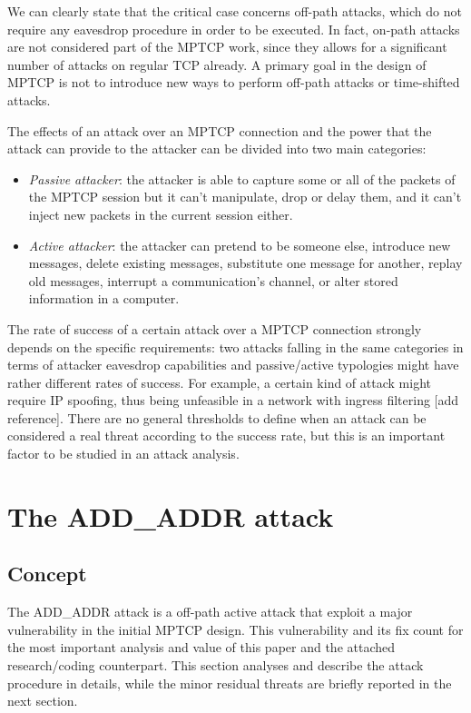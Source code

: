 We can clearly state that the critical case concerns off-path attacks, which do not require any eavesdrop procedure in order to be executed. In fact, on-path attacks are not considered part of the MPTCP work, since they allows for a significant number of attacks on regular TCP already. A primary goal in the design of MPTCP is not to introduce new ways to perform off-path attacks or time-shifted attacks.

The effects of an attack over an MPTCP connection and the power that the attack can provide to the attacker can be divided into two main categories:

\begin{itemize}  
\item \textit{Passive attacker}: the attacker is able to capture some or all of the packets of the MPTCP session but it can't manipulate, drop or delay them, and it can't inject new packets in the current session either.
\item \textit{Active attacker}: the attacker can pretend to be someone else, introduce new messages, delete existing messages, substitute one message for another, replay old messages, interrupt a communication’s channel, or alter stored information in a computer.
\end{itemize}

The rate of success of a certain attack over a MPTCP connection strongly depends on the specific requirements: two attacks falling in the same categories in terms of attacker eavesdrop capabilities and passive/active typologies might have rather different rates of success. For example, a certain kind of attack might require IP spoofing, thus being unfeasible in a network with ingress filtering [add reference].
There are no general thresholds to define when an attack can be considered a real threat according to the success rate, but this is an important factor to be studied in an attack analysis.

\section{The ADD\_ADDR attack} \label{theaddaddrattack}
\subsection{Concept}
The ADD\_ADDR attack is a off-path active attack that exploit a major vulnerability in the initial MPTCP design. This vulnerability and its fix count for the most important analysis and value of this paper and the attached research/coding counterpart. This section analyses and describe the attack procedure in details, while the minor residual threats are briefly reported in the next section.

